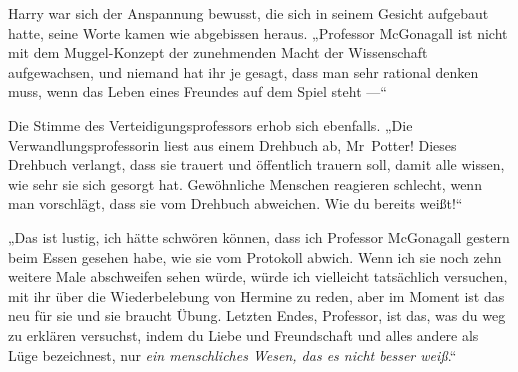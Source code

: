 Harry war sich der Anspannung bewusst, die sich in seinem Gesicht aufgebaut hatte, seine Worte kamen wie abgebissen heraus.
„Professor McGonagall ist nicht mit dem Muggel-Konzept der zunehmenden Macht der Wissenschaft aufgewachsen, und niemand hat ihr je gesagt, dass man sehr rational denken muss, wenn das Leben eines Freundes auf dem Spiel steht —“

Die Stimme des Verteidigungsprofessors erhob sich ebenfalls.
„Die Verwandlungsprofessorin liest aus einem Drehbuch ab, Mr~Potter! Dieses Drehbuch verlangt, dass sie trauert und öffentlich trauern soll, damit alle wissen, wie sehr sie sich gesorgt hat. Gewöhnliche Menschen reagieren schlecht, wenn man vorschlägt, dass sie vom Drehbuch abweichen. Wie du bereits weißt!“

„Das ist lustig, ich hätte schwören können, dass ich Professor McGonagall gestern beim Essen gesehen habe, wie sie vom Protokoll abwich. Wenn ich sie noch zehn weitere Male abschweifen sehen würde, würde ich vielleicht tatsächlich versuchen, mit ihr über die Wiederbelebung von Hermine zu reden, aber im Moment ist das neu für sie und sie braucht Übung. Letzten Endes, Professor, ist das, was du weg zu erklären versuchst, indem du Liebe und Freundschaft und alles andere als Lüge bezeichnest, nur \emph{ein menschliches Wesen, das es nicht besser weiß}.“

